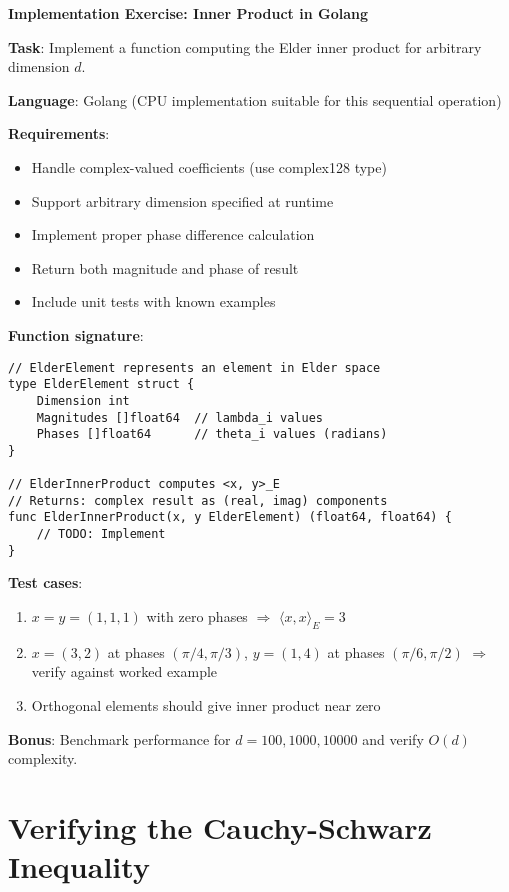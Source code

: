 \begin{coding}
\textbf{Implementation Exercise: Inner Product in Golang}

\textbf{Task}: Implement a function computing the Elder inner product for arbitrary dimension $d$.

\textbf{Language}: Golang (CPU implementation suitable for this sequential operation)

\textbf{Requirements}:
\begin{itemize}
\item Handle complex-valued coefficients (use complex128 type)
\item Support arbitrary dimension specified at runtime
\item Implement proper phase difference calculation  
\item Return both magnitude and phase of result
\item Include unit tests with known examples
\end{itemize}

\textbf{Function signature}:
\begin{lstlisting}[style=golang]
// ElderElement represents an element in Elder space
type ElderElement struct {
    Dimension int
    Magnitudes []float64  // lambda_i values
    Phases []float64      // theta_i values (radians)
}

// ElderInnerProduct computes <x, y>_E
// Returns: complex result as (real, imag) components
func ElderInnerProduct(x, y ElderElement) (float64, float64) {
    // TODO: Implement
}
\end{lstlisting}

\textbf{Test cases}:
\begin{enumerate}
\item $x = y = (1, 1, 1)$ with zero phases $\Rightarrow$ $\langle x,x \rangle_E = 3$
\item $x = (3, 2)$ at phases $(π/4, π/3)$, $y = (1, 4)$ at phases $(π/6, π/2)$ $\Rightarrow$ verify against worked example
\item Orthogonal elements should give inner product near zero
\end{enumerate}

\textbf{Bonus}: Benchmark performance for $d = 100, 1000, 10000$ and verify $O(d)$ complexity.
\end{coding}

\section{Verifying the Cauchy-Schwarz Inequality}

